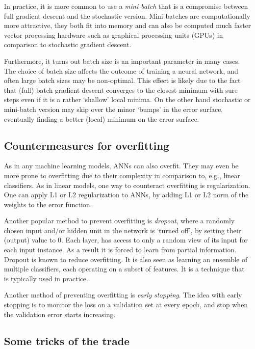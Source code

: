 In practice, it is more common to use a \emph{mini batch}
that is a compromise between full gradient descent and the stochastic version.
Mini batches are computationally more attractive,
they both fit into memory and can 
also be computed much faster vector processing hardware
such as graphical processing units (GPUs)
in comparison to stochastic gradient descent.

Furthermore, it turns out batch size is an important parameter in many cases.
The choice of batch size affects the outcome of training a neural network,
and often large batch sizes may be non-optimal.
This effect is likely due to the fact that (full) batch gradient descent
converges to the closest minimum with sure steps even if it is
a rather `shallow' local minima.
On the other hand stochastic or mini-batch version may 
skip over the minor `bumps' in the error surface,
eventually finding a better (local) minimum on the error surface.

\subsection{Countermeasures for overfitting}

As in any machine learning models, ANNs can also overfit.
They may even be more prone to overfitting due to their complexity
in comparison to, e.g., linear classifiers.
As in linear models, one way to counteract overfitting is regularization.
One can apply L1 or L2 regularization to ANNs,
by adding L1 or L2 norm of the weights to the error function.

Another popular method to prevent overfitting is \emph{dropout},
where a randomly chosen input and/or hidden unit in the network is `turned off',
by setting their (output) value to 0.
Each layer, has access to only a random view of its input
for each input instance.
As a result it is forced to learn from partial information.
Dropout is known to reduce overfitting.
It is also seen as learning an ensemble of multiple classifiers,
each operating on a subset of features.
It is a technique that is typically used in practice.

Another method of preventing overfitting is \emph{early stopping}.
The idea with early stopping is to monitor the loss on
a validation set at every epoch,
and stop when the validation error starts increasing.

\subsection{Some tricks of the trade}

